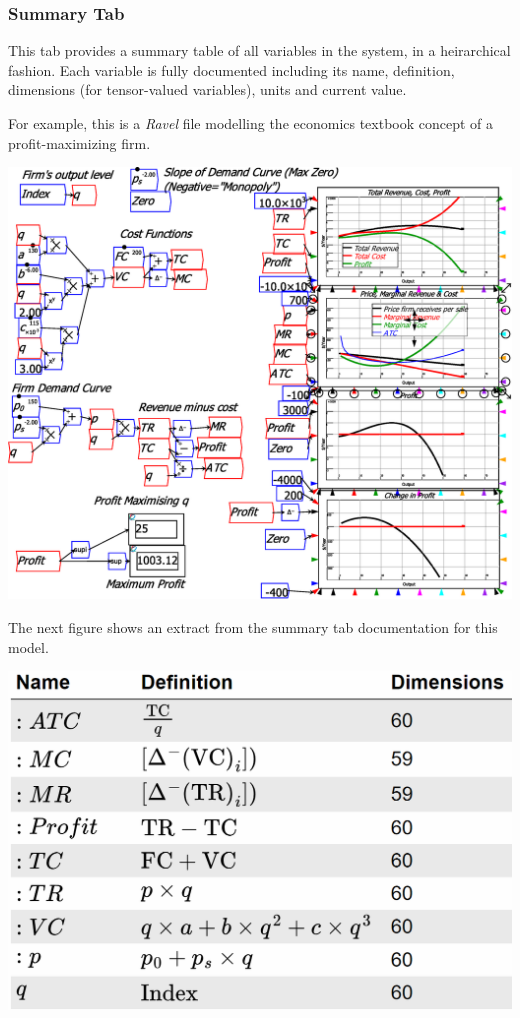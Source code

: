 \subsubsection{Summary Tab}

\label{tabs:Summary}

This tab provides a summary table of all variables in the system,
in a heirarchical fashion. Each variable is fully documented including
its name, definition, dimensions (for tensor-valued variables), units
and current value.

For example, this is a \emph{Ravel} file modelling the economics textbook
concept of a profit-maximizing firm.

\includegraphics[width=15cm]{images/NeoclassicalModelOfFirm}

The next figure shows an extract from the summary tab documentation
for this model.

\includegraphics[width=15cm]{images/SummaryTabScreenshot}

